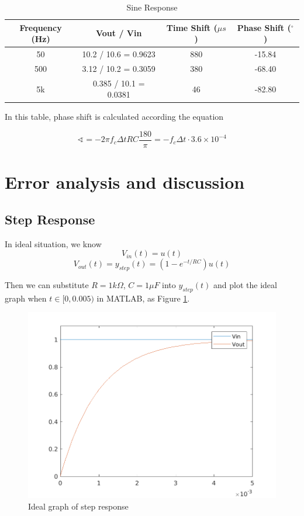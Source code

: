 \documentclass{article}
\begin{document}
\begin{table}[htbp]
	\centering
	\begin{tabular}{|c|c|c|c|}
		\hline
		Frequency (Hz) & Vout / Vin & Time Shift ($\mu s$) & Phase Shift ($^\circ$) \\
		\hline
		50 & 10.2 / 10.6 = 0.9623 & 880 & -15.84 \\
		\hline
		500 & 3.12 / 10.2  = 0.3059 & 380 & -68.40 \\
		\hline
		5k & 0.385 / 10.1 = 0.0381 & 46 & -82.80\\
		\hline
	\end{tabular}
	\caption{Sine Response}
	\label{tab-4}
\end{table}

In this table, phase shift is calculated according the equation

$$\sphericalangle=-2\pi f_c\Delta t RC \frac{180}{\pi}=-f_c\Delta t\cdot 3.6\times10^{-4}$$

\newpage

\section{Error analysis and discussion}
\subsection{Step Response}
In ideal situation, we know
$$V_{in}(t)=u(t)$$
$$V_{out}(t)=y_{step}(t)=(1-e^{-t/RC})u(t)$$

Then we can substitute $R=1k\Omega$, $C=1\mu F$ into $y_{step}(t)$ and plot the ideal graph when $t\in[0,0.005)$ in MATLAB, as Figure \ref{fig-1-ideal}.

\begin{figure}[htbp]
	\centering
	\includegraphics[width=0.7\linewidth]{ideal_1.png}
	\caption{Ideal graph of step response}
	\label{fig-1-ideal}
\end{figure}
\end{document}

